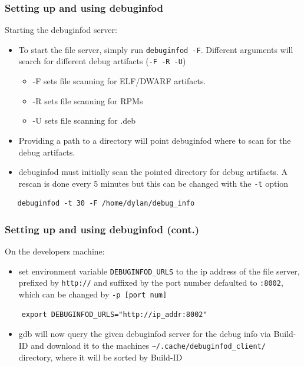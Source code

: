 \documentclass[12pt]{beamer}
\begin{document}
\begin{frame}[fragile]
   \fontsize{10pt}{10pt}{\selectfont}
   \frametitle{ Setting up and using debuginfod}
   Starting the debuginfod server:
   \begin{itemize}
      \item To start the file server, simply run \color{gray}\verb|debuginfod -F|\color{black}. 
         Different arguments will search for different debug artifacts (\verb|-F -R -U|)
         \begin{itemize}
            \item -F sets file scanning for ELF/DWARF artifacts.
            \item -R sets file scanning for RPMs
            \item -U sets file scanning for .deb
         \end{itemize}
      \item Providing a path to a directory will point debuginfod where to scan for the debug artifacts.
      \item debuginfod must initially scan the pointed directory for debug artifacts. 
         A rescan is done every 5 minutes but this can be changed with the
         \color{gray}\verb|-t| \color{black} option
   \end{itemize}
   \vspace{-.5cm}
   \color{gray}
   \begin{verbatim}
   debuginfod -t 30 -F /home/dylan/debug_info
   \end{verbatim}
\end{frame}

\begin{frame}[fragile]
   \fontsize{10pt}{10pt}\selectfont
   \frametitle{ Setting up and using debuginfod (cont.)}
   On the developers machine:
   \begin{itemize}
      \item set environment variable \color{gray}\verb|DEBUGINFOD_URLS|\color{black} to the ip address 
         of the file server, prefixed by \color{gray} \verb|http://| \color{black}and suffixed by the 
         port number defaulted to \color{gray} \verb|:8002|\color{black}, 
         which can be changed by \color{gray}\verb|-p [port num]|\color{black}
   \end{itemize}
   \color{gray}
   \begin{verbatim}
    export DEBUGINFOD_URLS="http://ip_addr:8002"
    \end{verbatim}
    \begin{itemize}
       \item gdb will now query the given debuginfod server for the debug info 
          via Build-ID and download it to the machines \color{gray}
          \verb|~/.cache/debuginfod_client/| \color{black}
          directory, where it will be sorted by Build-ID
    \end{itemize}
    


\end{frame}
\end{document}
